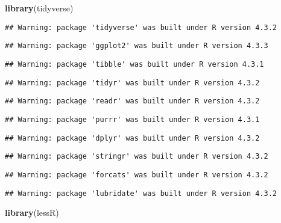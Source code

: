 \documentclass[
]{article}
\newenvironment{Shaded}{\begin{snugshade}}{\end{snugshade}}
\newcommand{\FunctionTok}[1]{\textcolor[rgb]{0.13,0.29,0.53}{\textbf{#1}}}
\newcommand{\NormalTok}[1]{#1}
\begin{document}
\begin{Shaded}
\begin{Highlighting}[]
\FunctionTok{library}\NormalTok{(tidyverse)}
\end{Highlighting}
\end{Shaded}

\begin{verbatim}
## Warning: package 'tidyverse' was built under R version 4.3.2
\end{verbatim}

\begin{verbatim}
## Warning: package 'ggplot2' was built under R version 4.3.3
\end{verbatim}

\begin{verbatim}
## Warning: package 'tibble' was built under R version 4.3.1
\end{verbatim}

\begin{verbatim}
## Warning: package 'tidyr' was built under R version 4.3.2
\end{verbatim}

\begin{verbatim}
## Warning: package 'readr' was built under R version 4.3.2
\end{verbatim}

\begin{verbatim}
## Warning: package 'purrr' was built under R version 4.3.1
\end{verbatim}

\begin{verbatim}
## Warning: package 'dplyr' was built under R version 4.3.2
\end{verbatim}

\begin{verbatim}
## Warning: package 'stringr' was built under R version 4.3.2
\end{verbatim}

\begin{verbatim}
## Warning: package 'forcats' was built under R version 4.3.2
\end{verbatim}

\begin{verbatim}
## Warning: package 'lubridate' was built under R version 4.3.2
\end{verbatim}

\begin{Shaded}
\begin{Highlighting}[]
\FunctionTok{library}\NormalTok{(lessR)}
\end{Highlighting}
\end{Shaded}
\end{document}
